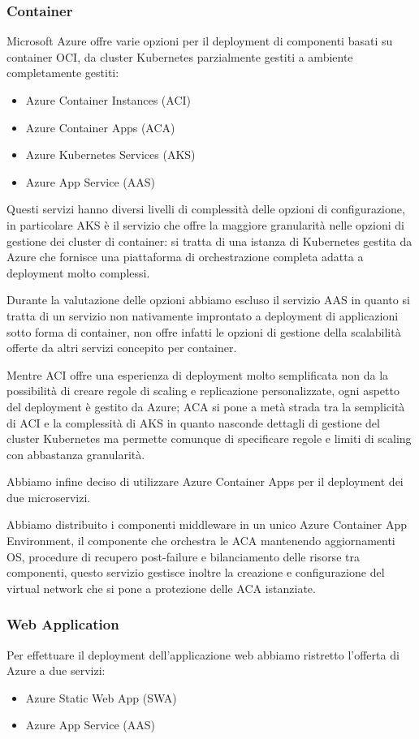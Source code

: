 \subsubsection{Container}
Microsoft Azure offre varie opzioni per il deployment di componenti basati su container OCI, da cluster Kubernetes parzialmente gestiti a ambiente completamente gestiti:
\begin{itemize}
    \item Azure Container Instances (ACI)
    \item Azure Container Apps (ACA)
    \item Azure Kubernetes Services (AKS)
    \item Azure App Service (AAS)
\end{itemize}

Questi servizi hanno diversi livelli di complessità delle opzioni di configurazione, in particolare AKS è il servizio che offre la maggiore granularità nelle opzioni di gestione dei cluster di container: si tratta di una istanza di Kubernetes gestita da Azure che fornisce una piattaforma di orchestrazione completa adatta a deployment molto complessi.

Durante la valutazione delle opzioni abbiamo escluso il servizio AAS in quanto si tratta di un servizio non nativamente improntato a deployment di applicazioni sotto forma di container, non offre infatti le opzioni di gestione della scalabilità offerte da altri servizi concepito per container.

Mentre ACI offre una esperienza di deployment molto semplificata non da la possibilità di creare regole di scaling e replicazione personalizzate, ogni aspetto del deployment è gestito da Azure; ACA si pone a metà strada tra la semplicità di ACI e la complessità di AKS in quanto nasconde dettagli di gestione del cluster Kubernetes ma permette comunque di specificare regole e limiti di scaling con abbastanza granularità.

Abbiamo infine deciso di utilizzare Azure Container Apps per il deployment dei due microservizi.

Abbiamo distribuito i componenti middleware in un unico Azure Container App Environment, il componente che orchestra le ACA mantenendo aggiornamenti OS, procedure di recupero post-failure e bilanciamento delle risorse tra componenti, questo servizio gestisce inoltre la creazione e configurazione del virtual network che si pone a protezione delle ACA istanziate.

\subsubsection{Web Application}
Per effettuare il deployment dell'applicazione web abbiamo ristretto l'offerta di Azure a due servizi:
\begin{itemize}
    \item Azure Static Web App (SWA)
    \item Azure App Service (AAS)
\end{itemize}

